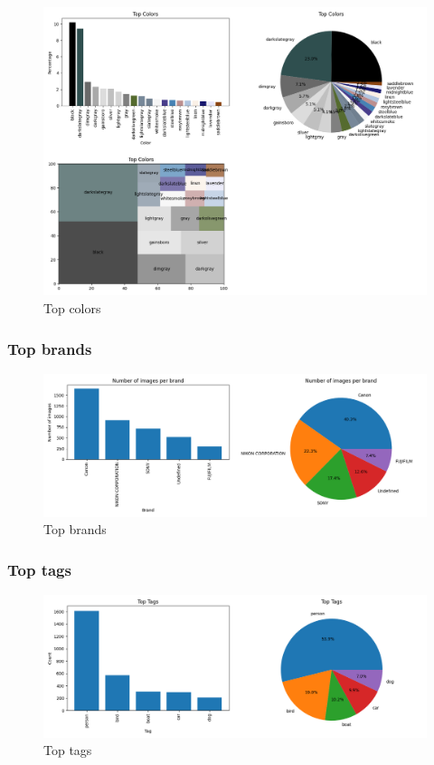 \documentclass{article}
\begin{document}
    \begin{figure}[htbp]
        \centering
        \includegraphics[width=0.9 \textwidth]{img/dominant_color}
        \caption{Top colors}
        \label{fig:dominant_colors}

    \end{figure}

    \subsubsection{Top brands}\label{subsubsec:top_brands}

    \begin{figure}[htbp]
        \centering
        \includegraphics[width=0.8 \textwidth]{img/brand}
        \caption{Top brands}
        \label{fig:top_brands}
    \end{figure}

    \newpage

    \subsubsection{Top tags}\label{subsubsec:top_tags}

    \begin{figure}[htbp]
        \centering
        \includegraphics[width=0.85 \textwidth]{img/tags}
        \caption{Top tags}
        \label{fig:top_tags}
    \end{figure}
\end{document}
